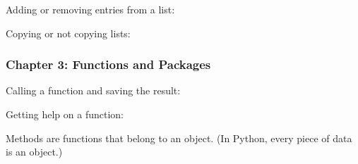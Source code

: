 \documentclass[letterpaper,10pt,english]{sphinxmanual}
\begin{document}
Adding or removing entries from a list:

\begin{sphinxVerbatim}[commandchars=\\\{\}]
  \PYG{p}{[}    \PYG{p}{]}
    \PYG{p}{[}   \PYG{p}{]}
    
 \PYG{p}{[}\PYG{p}{]}     
 \PYG{p}{[}\PYG{p}{]}     
\end{sphinxVerbatim}

Copying or not copying lists:

\begin{sphinxVerbatim}[commandchars=\\\{\}]
  
  \PYG{p}{[}\PYG{p}{]}
\end{sphinxVerbatim}


\subsubsection{Chapter 3: Functions and Packages}
\label{\detokenize{big-cheat-sheet:chapter-3-functions-and-packages}}
Calling a function and saving the result:

\begin{sphinxVerbatim}[commandchars=\\\{\}]
    
\end{sphinxVerbatim}

Getting help on a function:

\begin{sphinxVerbatim}[commandchars=\\\{\}]
  
\end{sphinxVerbatim}

Methods are functions that belong to an object.  (In Python, every piece of data is an object.)
\end{document}
